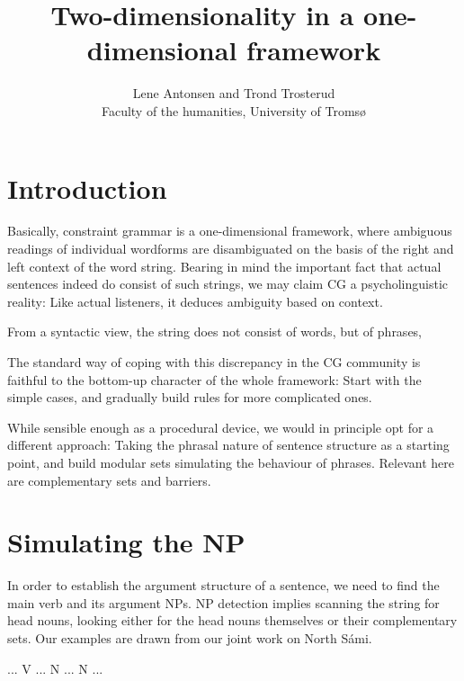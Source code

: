 \documentclass[a4paper,english]{article}
\begin{document}
\title{Two-dimensionality in a one-dimensional framework}

\author{Lene Antonsen and Trond Trosterud\\ 
Faculty of the humanities,  University of Tromsø}


\maketitle


\section{Introduction}

Basically, constraint grammar is a one-dimensional framework, where ambiguous readings of individual wordforms are disambiguated on the basis of the right and left context of the word string. Bearing in mind the important fact that actual sentences indeed do consist of such strings, we may claim CG a psycholinguistic reality: Like actual listeners, it deduces ambiguity based on context.

From a syntactic view, the string does not consist of words, but of phrases,

The standard way of coping with this discrepancy in the CG community is faithful to the bottom-up character of the whole framework: Start with the simple cases, and gradually build rules for more complicated ones.

While sensible enough as a procedural device, we would in principle opt for a different approach: Taking the phrasal nature of sentence structure as a starting point, and build modular sets simulating the behaviour of phrases. Relevant here are complementary sets and barriers.

\section{Simulating the NP}

In order to establish the argument structure of a sentence, we need to find the main verb and its argument NPs. NP detection implies scanning the string for head nouns, looking either for the head nouns themselves or their complementary sets. Our examples are drawn from our joint work on North Sámi.

\begin{example}\label{islands}
... V ... N ... N ...
\end{example}
\end{document}
